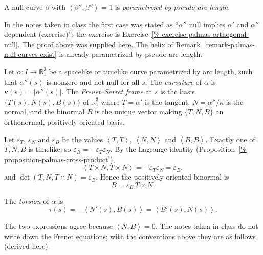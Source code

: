\begin{definition}
\label{definition-palmas-pseudo-arc-length}
A null curve $\beta$ with
$\left\langle{} \beta'',\beta''
\right\rangle{}=1$ is
\emph{parametrized by pseudo-arc length}.
\end{definition}

In the notes taken in class the first case
was stated as ``$\alpha''$ null implies
$\alpha'$ and $\alpha''$ dependent
(exercise)''; the exercise is
Exercise~\ref{%
exercise-palmas-orthogonal-null}.
The proof above was supplied here. The
helix of
Remark~\ref{remark-palmas-null-curves-exist}
is already parametrized by pseudo-arc
length.

\begin{definition}
\label{definition-palmas-frenet-frame}
Let $\alpha\colon I\to\mathbb{R}^3_1$ be a
spacelike or timelike curve parametrized
by arc length, such that $\alpha''(s)$ is
nonzero and not null for all $s$. The
\emph{curvature} of $\alpha$ is
$\kappa(s)=|\alpha''(s)|$. The
\emph{Frenet--Serret frame} at $s$ is the
basis $\{T(s),N(s),B(s)\}$ of
$\mathbb{R}^3_1$ where $T=\alpha'$ is the
tangent, $N=\alpha''/\kappa$ is the
normal, and the binormal $B$ is the unique
vector making $\{T,N,B\}$ an orthonormal,
positively oriented basis.
\end{definition}

\begin{remark}
\label{remark-palmas-binormal}
Let $\varepsilon_T$, $\varepsilon_N$ and
$\varepsilon_B$ be the values
$\left\langle{} T,T \right\rangle{}$,
$\left\langle{} N,N \right\rangle{}$ and
$\left\langle{} B,B \right\rangle{}$.
Exactly one of $T,N,B$ is timelike, so
$\varepsilon_B=-\varepsilon_T
\varepsilon_N$. By the Lagrange identity
(Proposition~\ref{%
proposition-palmas-cross-product}),
$$
\left\langle{} T\times N,T\times N
\right\rangle{}
=-\varepsilon_T\varepsilon_N
=\varepsilon_B,
$$
and $\det(T,N,T\times N)=\varepsilon_B$.
Hence the positively oriented binormal is
$$
B=\varepsilon_B\,T\times N.
$$
\end{remark}

\begin{definition}[Torsion]
\label{definition-palmas-torsion}
The \emph{torsion} of $\alpha$ is
$$
\tau(s)=-\left\langle{} N'(s),B(s)
\right\rangle{}
=\left\langle{} B'(s),N(s)
\right\rangle{}.
$$
\end{definition}

The two expressions agree because
$\left\langle{} N,B \right\rangle{}=0$.
The notes taken in class do not write down
the Frenet equations; with the
conventions above they are as follows
(derived here).

